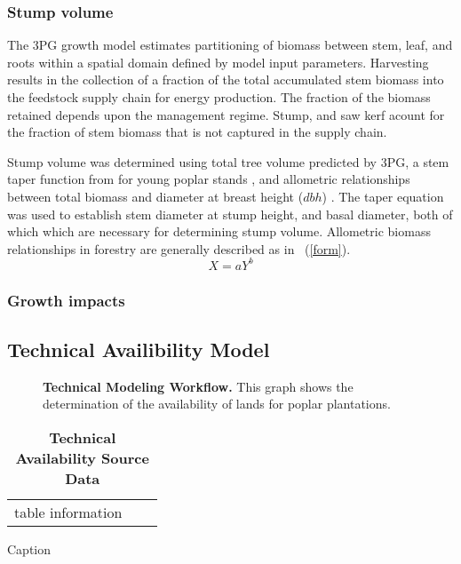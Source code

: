 \documentclass[10pt]{article}
\begin{document}
\subsubsection*{Stump volume}
\label{sec:stump-volume}

The 3PG growth model estimates partitioning of biomass between stem,
leaf, and roots within a spatial domain defined by model input
parameters. Harvesting results in the collection of a fraction
of the total accumulated stem biomass into the feedstock supply chain
for energy production. The fraction of the biomass retained depends
upon the management regime. Stump, and saw kerf acount for the
fraction of stem biomass that is not captured in the supply chain.

Stump volume was determined using total tree volume predicted by 3PG,
a stem taper function from for young poplar stands
\cite{Benbrahim2003} , and allometric relationships between total
biomass and diameter at breast height ($dbh$) \cite{Brahim2000}. The
taper equation was used to establish stem diameter at stump height,
and basal diameter, both of which which are necessary for determining
stump volume. Allometric biomass relationships in forestry are generally described as in ~(\ref{form}). 
\begin{equation}
  \label{eq:form}
  X=aY^b
\end{equation}



\subsubsection{Growth impacts}
\label{sec:growth-impacts}






\subsection*{Technical Availibility Model}

\begin{figure}[!ht]
\begin{center}
\end{center}
\caption{ {\bf Technical Modeling Workflow.} This graph shows the determination of the availability of lands for poplar plantations.  }
\label{fig:tech-model}
\end{figure}


\begin{table}[!ht]
\caption{
\bf{Technical Availability Source Data}}
\begin{tabular}{|c|c|c|}
table information
\end{tabular}
\begin{flushleft}Caption
\end{flushleft}
\label{tab:}
 \end{table}
\end{document}
